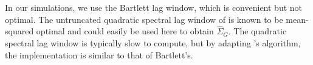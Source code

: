 \documentclass[11pt]{article}
\theoremstyle{remark}
\begin{document}




In our simulations, we use the Bartlett lag window, which is convenient but not optimal. The untruncated quadratic spectral lag window of \cite{andr:1991} is known to be mean-squared optimal and could easily be used here to obtain $\hat{\Sigma}_G$. The quadratic spectral lag window is typically slow to compute, but by adapting  \citeauthor{heberle2017fast}'s algorithm, the implementation is similar to that of Bartlett's. 

%
\end{document}
